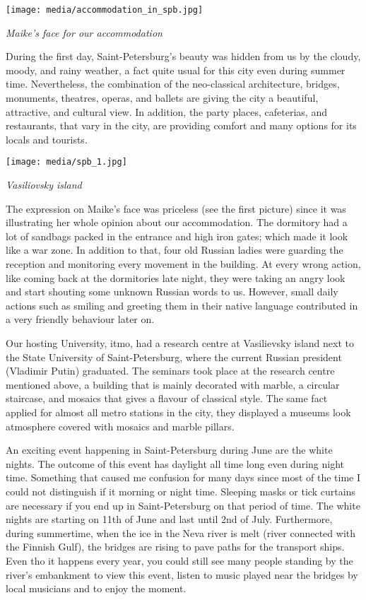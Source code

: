 \documentclass[10pt,a4paper]{article} %
\begin{document}
\begin{multicols}{3}
\begin{center}
	\texttt{[image: media/accommodation\_in\_spb.jpg]}
	\par\textit{Maike's face for our accommodation}
\end{center}

During the first day, Saint-Petersburg's beauty was hidden from us by the cloudy, 
moody, and rainy weather, a fact quite usual for this city even during summer time.  
Nevertheless, the combination of the neo-classical architecture, bridges, monuments, 
theatres, operas, and ballets are giving the city a beautiful, attractive, 
and cultural view. 
In addition, the party places, cafeterias, and restaurants, that vary in the 
city, are providing comfort and many options for its locals and tourists. 

\begin{center}
	\texttt{[image: media/spb\_1.jpg]}
	\par\textit{Vasiliovsky island}
\end{center}

The expression on Maike's face was priceless (see the first picture)
since it was illustrating her whole opinion about our accommodation. 
The dormitory had a lot of sandbags packed in the entrance and high iron gates; 
which made it look like a war zone.  
In addition to that, four old Russian ladies were guarding the reception and 
monitoring every movement in the building. 
At every wrong action, like coming back at the dormitories late night, they 
were taking an angry look and start shouting some unknown Russian words to us. 
However, small daily actions such as smiling and greeting them in their native 
language contributed in a very friendly behaviour later on.

Our hosting University, {\sc itmo}, had a research centre at Vasilievsky island 
next to the State University of Saint-Petersburg, where the current Russian 
president (Vladimir Putin) graduated. 
The seminars took place at the research centre mentioned above, a building that 
is mainly decorated with marble, a circular staircase, 
and mosaics that gives a flavour of classical style. 
The same fact applied for almost all metro stations in the city, they displayed
a museums look atmosphere covered with mosaics and marble pillars. 

An exciting event happening in Saint-Petersburg during June are the white nights.
The outcome of this event has daylight all time long even during night 
time. 
Something that caused me confusion for many days since most of the time I could not 
distinguish if it morning or night time. 
Sleeping masks or tick curtains are necessary if you end up in Saint-Petersburg 
on that period of time. 
The white nights are starting on 11th of June and last until 2nd of July.
Furthermore, during summertime, when the ice in the Neva river is melt (river 
connected with the Finnish Gulf), the bridges are rising to pave paths for the 
transport ships. 
Even tho it happens every year, you could still see many people standing by the 
river's embankment to view this event, listen to music played near the bridges by 
local musicians and to enjoy the moment.
 

\end{multicols}
\end{document}
